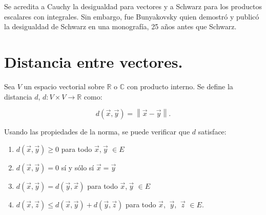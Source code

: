 \begin{remark}
Se acredita a Cauchy la desigualdad para vectores y a Schwarz para los productos escalares con integrales. Sin embargo, fue Bunyakovsky quien demostró y publicó la desigualdad de Schwarz en una monografía, 25 años antes que Schwarz.
\end{remark}

\bigskip







\section{Distancia entre vectores.}

\bigskip

\begin{definition}



Sea $V$ un espacio vectorial sobre $\mathbb{R}$ o $\mathbb{C}$ con producto interno. Se define la distancia $d$, $d :  V \times V\rightarrow \mathbb{R}$  como:

$$d(\vec{x},\vec{y})=\left\|\vec{x}-\vec{y}\right\|.$$
\end{definition}

\bigskip

Usando las propiedades de la norma, se puede verificar que $d$ satisface:

\bigskip

\begin{enumerate}

\item   $d(\vec{x},\vec{y}) \geq 0 $  para todo $\vec{x}$,$~\vec{y}$ $\in E$

\bigskip

\item   $d(\vec{x},\vec{y})= 0 $  sí y sólo sí  $\vec{x}=\vec{y}$ 

\bigskip

\item   $d(\vec{x},\vec{y})= d(\vec{y},\vec{x})$  para todo $\vec{x}$,$~\vec{y}$ $\in E$

\bigskip

 \item  $d(\vec{x},\vec{z})\leq d(\vec{x},\vec{y})+ d(\vec{y},\vec{z})   $  para todo $\vec{x}$, $~\vec{y}$, $~\vec{z}$ $\in E$.

\bigskip

\bigskip

\bigskip

\end{enumerate}

